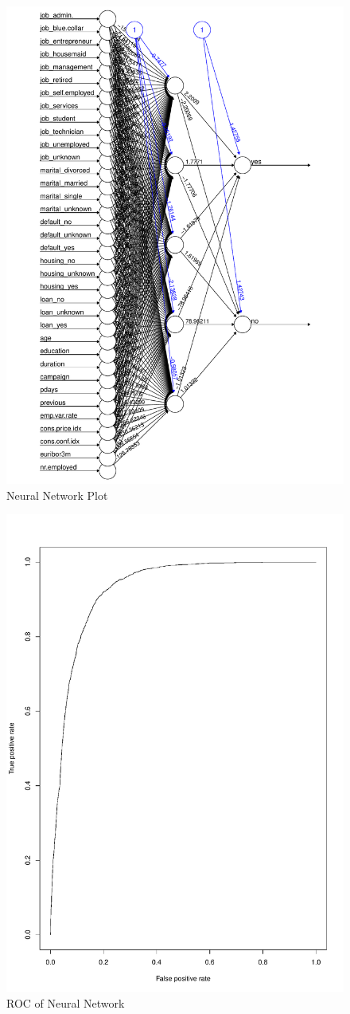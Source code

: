 \documentclass[12pt, a4paper, bibliography=totoc, english]{scrartcl}
\begin{document}

\begin{figure}
	\centering
	\includegraphics[width=0.7\linewidth]{neuralnetworkplot}
	\caption{Neural Network Plot}
	\label{fig:neuralnetworkplot}
\end{figure}

\begin{figure}
	\centering
	\includegraphics[width=0.7\linewidth]{rocplot}
	\caption{ROC of Neural Network}
	\label{fig:rocplot}
\end{figure}
\end{document}
